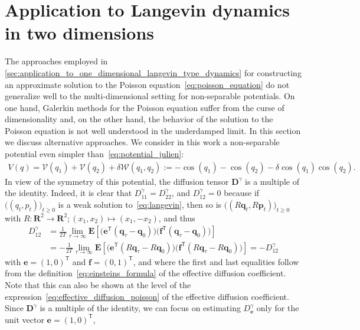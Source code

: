 \documentclass[11pt,a4paper]{article}
\newcommand{\expect}[0]{\mathbf{E}}
\newcommand{\real}{\mathbf R}
\newcommand{\vect}[1]{\boldsymbol{\mathbf #1}}
\newcommand{\mat}[1]{\vect #1}
\renewcommand{\t}{\mathsf T}
\theoremstyle{plain}
\numberwithin{equation}{section}
\renewcommand{\geq}{\geqslant}
\begin{document}
\section{Application to Langevin dynamics in two dimensions}%
\label{sec:applications_2d}%
The approaches employed in \cref{sec:application_to_one_dimensional_langevin_type_dynamics} for constructing an approximate solution to the Poisson equation~\eqref{eq:poisson_equation}
do not generalize well to the multi-dimensional setting for non-separable potentials.
On one hand, Galerkin methods for the Poisson equation suffer from the curse of dimensionality and,
on the other hand, the behavior of the solution to the Poisson equation is not well understood in the underdamped limit.
In this section we discuss alternative approaches.
We consider in this work a non-separable potential even simpler than~\eqref{eq:potential_julien}:
\begin{align}
    \label{eq:potential_simple}
    V(q) =  \mathcal V(q_1) + \mathcal V(q_2) + \delta \mathcal W(q_1, q_2) := - \cos(q_1) - \cos(q_2) - \delta \cos(q_1) \cos(q_2).
\end{align}
In view of the symmetry of this potential,
the diffusion tensor $\mat D^{\gamma}$ is a multiple of the identity.
Indeed, it is clear that $D^{\gamma}_{11} = D^{\gamma}_{22}$,
and $D^{\gamma}_{12} = 0$ because if $\bigl((q_t, p_t)\bigr)_{t \geq 0}$ is a weak solution to~\eqref{eq:langevin},
then so is $\bigl((R \vect q_t, R \vect p_t)\bigr)_{t \geq 0}$ with $R: \real^2 \to \real^2; (x_1, x_2) \mapsto (x_1, -x_2)$,
and thus
\begin{align*}
    D^{\gamma}_{12}
    &= \frac{1}{2T} \lim_{\tau \to \infty}
    \expect \left[ \bigl(\vect e^\t (\vect q_{\tau} - \vect q_0)\bigr) \bigl(\vect f^\t (\vect q_{\tau} - \vect q_0)\bigr) \right] \\
    &= - \frac{1}{2T} \lim_{\tau \to \infty}
    \expect \left[ \bigl(\vect e^\t (R \vect q_{\tau} - R \vect q_0)\bigr) \bigl(\vect f^\t (R \vect q_{\tau} - R \vect q_0)\bigr) \right]
    = - D^{\gamma}_{12}
\end{align*}
with $\vect e = (1, 0)^\t$ and $\vect f = (0, 1)^\t$,
and where the first and last equalities follow from the definition~\eqref{eq:einsteins_formula} of the effective diffusion coefficient.
Note that this can also be shown at the level of the expression~\eqref{eq:effective_diffusion_poisson} of the effective diffusion coefficient.
Since $\mat D^{\gamma}$ is a multiple of the identity,
we can focus on estimating $D^{\gamma}_{\vect e}$ only for the unit vector $\vect e = (1, 0)^\t$,
\end{document}
